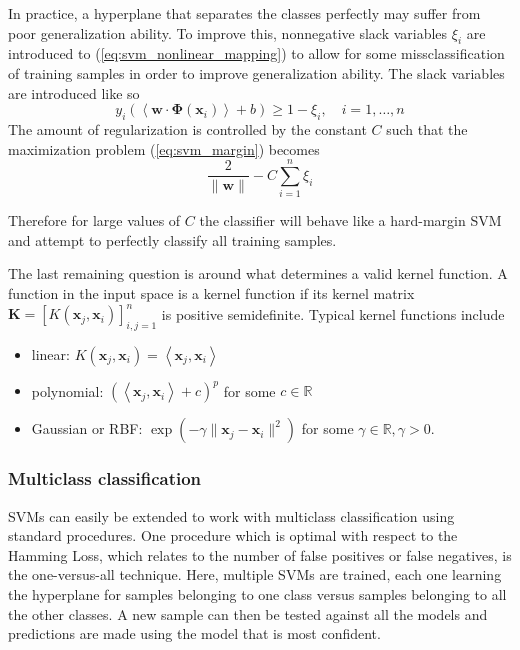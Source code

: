 In practice, a hyperplane that separates the classes perfectly may suffer from
poor generalization ability. To improve this, nonnegative slack variables
$\xi_i$ are introduced to (\ref{eq:svm_nonlinear_mapping}) to allow for some
missclassification of training samples in order to improve generalization
ability. The slack variables are introduced like so
\begin{equation}\label{eq:svm_nonlinear_mapping_slack}
y_i\left( \left< \mathbf{w} \cdot \boldsymbol{\Phi}(\mathbf{x}_i) \right> + b
\right) \ge 1 - \xi_i, \hspace{1em}
i = 1,\ldots,n
\end{equation}
The amount of regularization is controlled by the constant $C$ such that the
maximization problem (\ref{eq:svm_margin}) becomes
\begin{equation}
\frac{2}{\|\mathbf{w}\|} - C \sum_{i=1}^{n} \xi_i
\end{equation}

Therefore for large values of $C$ the classifier will behave like a hard-margin
SVM and attempt to perfectly classify all training samples.

The last remaining question is around what determines a valid kernel function. A
function in the input space is a kernel function if its kernel matrix
$\mathbf{K} = \left[ K(\mathbf{x}_j,\mathbf{x}_i) \right]^{n}_{i,j=1}$ is
positive semidefinite. Typical kernel functions include
\begin{itemize}

  \item linear: $K(\mathbf{x}_j,\mathbf{x}_i) = \left< \mathbf{x}_j, \mathbf{x}_i \right>$

  \item polynomial: $\left(\left< \mathbf{x}_j, \mathbf{x}_i \right> + c\right)^p$
    for some $c \in \mathbb{R}$

  \item Gaussian or RBF\@: $\exp \left( -\gamma \|\mathbf{x}_j-\mathbf{x}_i\|^2 \right)$
    for some $\gamma \in \mathbb{R}, \gamma > 0$.

\end{itemize}

\subsubsection{Multiclass classification}\label{sssec:multiclass}

SVMs can easily be extended to work with multiclass classification using
standard procedures. One procedure which is optimal with respect to the Hamming
Loss, which relates to the number of false positives or false negatives, is the
one-versus-all technique. Here, multiple SVMs are trained, each one learning the
hyperplane for samples belonging to one class versus samples belonging to all
the other classes. A new sample can then be tested against all the models and
predictions are made using the model that is most confident.

